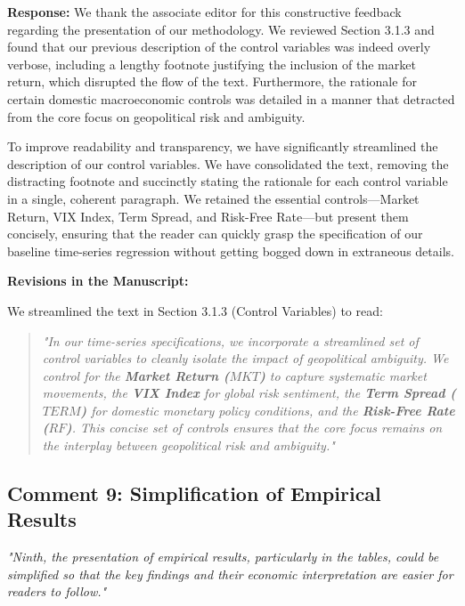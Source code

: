 \documentclass[12pt]{article}
\begin{document}
\begin{highlightbox}
\textbf{Response:} We thank the associate editor for this constructive feedback regarding the presentation of our methodology. We reviewed Section 3.1.3 and found that our previous description of the control variables was indeed overly verbose, including a lengthy footnote justifying the inclusion of the market return, which disrupted the flow of the text. Furthermore, the rationale for certain domestic macroeconomic controls was detailed in a manner that detracted from the core focus on geopolitical risk and ambiguity.

To improve readability and transparency, we have significantly streamlined the description of our control variables. We have consolidated the text, removing the distracting footnote and succinctly stating the rationale for each control variable in a single, coherent paragraph. We retained the essential controls—Market Return, VIX Index, Term Spread, and Risk-Free Rate—but present them concisely, ensuring that the reader can quickly grasp the specification of our baseline time-series regression without getting bogged down in extraneous details.
\end{highlightbox}

\begin{highlightbox}
\textbf{Revisions in the Manuscript:}

We streamlined the text in Section 3.1.3 (Control Variables) to read:
\vspace{0.2cm}
\begin{quote}
\color{red}\itshape "In our time-series specifications, we incorporate a streamlined set of control variables to cleanly isolate the impact of geopolitical ambiguity. We control for the \textbf{Market Return ($MKT$)} to capture systematic market movements, the \textbf{VIX Index} for global risk sentiment, the \textbf{Term Spread ($TERM$)} for domestic monetary policy conditions, and the \textbf{Risk-Free Rate ($RF$)}. This concise set of controls ensures that the core focus remains on the interplay between geopolitical risk and ambiguity."
\end{quote}
\end{highlightbox}

\subsection*{Comment 9: Simplification of Empirical Results}
\textit{"Ninth, the presentation of empirical results, particularly in the tables, could be simplified so that the key findings and their economic interpretation are easier for readers to follow."}
\end{document}

